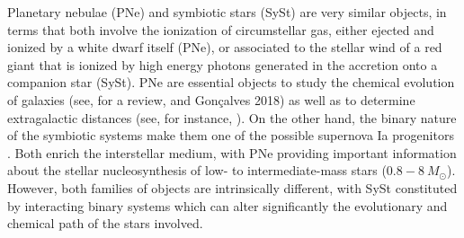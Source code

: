 \documentclass{article}
\newcommand\msol{M_\odot}
\newcommand\oiii{\ensuremath{\mathrm{[O\,III]}}}
\begin{document}

Planetary nebulae (PNe) and symbiotic stars (SySt) are very similar objects, in terms that both involve the ionization of circumstellar gas,
either ejected and ionized by a white dwarf itself (PNe), or associated to the stellar wind of a red giant that is ionized by high
energy photons generated in the accretion onto a companion star
(SySt).
PNe are essential objects to study the chemical evolution of galaxies (see, for a review, \citealp{Magrini:2012} and Gonçalves 2018) as well as to determine extragalactic distances (see, for instance, \citealp{Ciardullo:2012}). On the other hand, the binary nature of the symbiotic systems make them one of the possible supernova Ia progenitors \citep{Whelan:1973, Chen:2011}.
Both enrich the interstellar medium, with PNe providing important information about the stellar nucleosynthesis of low- to intermediate-mass stars (\(0.8 - 8~\msol\)). However, both families of objects are intrinsically different, with SySt constituted by interacting binary systems which can alter significantly the evolutionary and chemical path of the stars involved.
\end{document}
